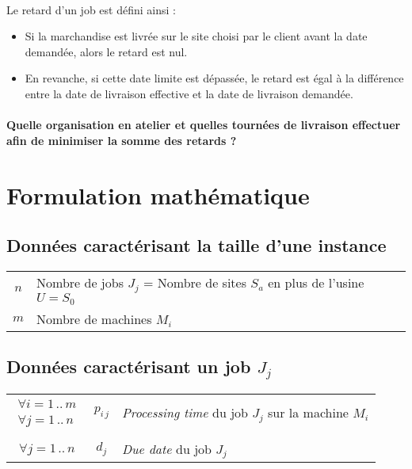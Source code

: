 \paragraph{}
Le retard d’un job est défini ainsi :
\begin{itemize}
\item Si la marchandise est livrée sur le site choisi par le client avant la date demandée, alors le retard est nul.
\item En revanche, si cette date limite est dépassée, le retard est égal à la différence entre la date de livraison effective et la date de livraison demandée.
\end{itemize}

\paragraph{}
\textbf{Quelle organisation en atelier et quelles tournées de livraison effectuer afin de minimiser la somme des retards ?}

\newpage


\section{Formulation mathématique}

\subsection*{Données caractérisant la taille d'une instance}

\begin{tabular}{cl}
$ n $ & Nombre de jobs $ J_{j} $ = Nombre de sites $ S_{a} $ en plus de l'usine $ U = S_{0} $ \\
$ m $ & Nombre de machines $ M_{i} $ \\
\end{tabular}

\subsection*{Données caractérisant un job $ J_{j} $}

\begin{tabular}{ccl}
$ \begin{array}{l} \forall i = 1 \, .. \, m \\ \forall j = 1 \, .. \, n \end{array} $ & $ p_{i \, j}$ & \textit{Processing time} du job $ J_{j} $ sur la machine $ M_{i} $ \\
\\
$ \forall j = 1 \, .. \, n $ & $ d_{j} $ & \textit{Due date} du job $ J_{j} $ \\
\end{tabular}

